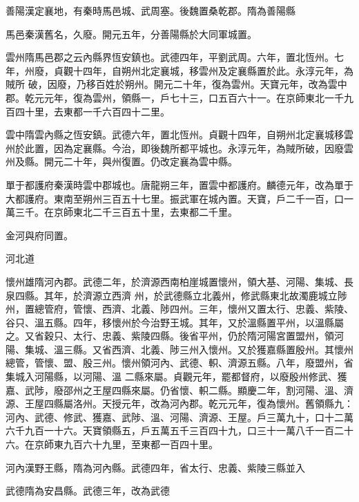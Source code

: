 \begin{pinyinscope}
 善陽漢定襄地，有秦時馬邑城、武周塞。後魏置桑乾郡。隋為善陽縣



 馬邑秦漢舊名，久廢。開元五年，分善陽縣於大同軍城置。



 雲州隋馬邑郡之云內縣界恆安鎮也。武德四年，平劉武周。六年，置北恆州。七年，州廢，貞觀十四年，自朔州北定襄城，移雲州及定襄縣置於此。永淳元年，為賊所
 破，因廢，乃移百姓於朔州。開元二十年，復為雲州。天寶元年，改為雲中郡。乾元元年，復為雲州，領縣一，戶七十三，口五百六十一。在京師東北一千九百四十里，去東都一千六百四十二里。



 雲中隋雲內縣之恆安鎮。武德六年，置北恆州。貞觀十四年，自朔州北定襄城移雲州於此置，因為定襄縣。今治，即後魏所都平城也。永淳元年，為賊所破，因廢雲州及縣。開元二十年，與州復置。仍改定襄為雲中縣。



 單于都護府秦漢時雲中郡城也。唐龍朔三年，置雲中都護府。麟德元年，改為單于大都護府。東南至朔州三百五十七里。振武軍在城內置。天寶，戶二千一百，口一萬三千。在京師東北二千三百五十里，去東都二千里。



 金河與府同置。



 河北道



 懷州雄隋河內郡。武德二年，於濟源西南柏崖城置懷州，領大基、河陽、集城、長泉四縣。其年，於濟源立西濟
 州，於武德縣立北義州，修武縣東北故濁鹿城立陟州，置總管府，管懷、西濟、北義、陟四州。三年，懷州又置太行、忠義、紫陵、谷只、溫五縣。四年，移懷州於今治野王城。其年，又於溫縣置平州，以溫縣屬之。又省穀只、太行、忠義、紫陵四縣。後省平州，仍於隋河陽宮置盟州，領河陽、集城、溫三縣。又省西濟、北義、陟三州入懷州。又於獲嘉縣置殷州。其懷州總管，管懷、盟、殷三州。懷州領河內、武德、軹、濟源五縣。八年，廢盟州，省集城入河陽縣，以河陽、溫
 二縣來屬。貞觀元年，罷都督府，以廢殷州修武、獲嘉、武陟，廢邵州之王屋四縣來屬。仍省懷、軹二縣。顯慶二年，割河陽、溫、濟源、王屋四縣屬洛州。天授元年，改為河內郡。乾元元年，復為懷州。舊領縣九：河內、武德、修武、獲嘉、武陟、溫、河陽、濟源、王屋。戶三萬九十，口十二萬六千九百一十六。天寶領縣五，戶五萬五千三百四十九，口三十一萬八千一百二十六。在京師東九百六十九里，至東都一百四十里。



 河內漢野王縣，隋為河內縣。武德四年，省太行、忠義、紫陵三縣並入



 武德隋為安昌縣。武德三年，改為武德




\end{pinyinscope}
